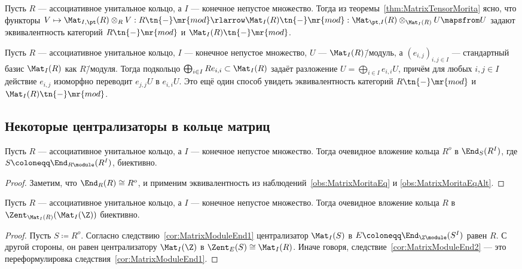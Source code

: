 \documentclass[
	extrafontsizes,
	11pt,
	hyphens,
]{memoir}
\begin{document}
\begin{observation}
Пусть \(R\) --- ассоциативное унитальное кольцо, а \(I\) --- конечное непустое множество.%
\label{obs:MatrixMoritaEq}
Тогда из теоремы~\ref{thm:MatrixTensorMorita} ясно, что функторы \(V \mapsto \Mat_{I, \pt}(R) \otimes_R V : R\tn{-}\mr{mod} \rlarrow \Mat_I(R)\tn{-}\mr{mod} : \Mat_{\pt, I}(R) \otimes_{\Mat_I(R)} U \mapsfrom U\)
задают эквивалентность категорий \(R\tn{-}\mr{mod}\) и \(\Mat_I(R)\tn{-}\mr{mod}\).
\end{observation}

\begin{observation}
Пусть \(R\) --- ассоциативное унитальное кольцо, \(I\) --- конечное непустое множество, \(U\) --- \(\Mat_I(R)\)\=/модуль, а \((e_{i,j})_{i,j \in I}\) --- стандартный базис \(\Mat_I(R)\) как \(R\)\=/модуля.%
\label{obs:MatrixMoritaEqAlt}
Тогда подкольцо \(\bigoplus_{i \in I} R e_{i,i} \subset \Mat_I(R)\) задаёт разложение \(U = \bigoplus_{i \in I} e_{i,i} U\), причём для любых \(i,j \in I\) действие \(e_{i,j}\) изоморфно переводит \(e_{j,j} U\) в \(e_{i,i} U\). Это ещё один способ увидеть эквивалентность категорий \(R\tn{-}\mr{mod}\) и \(\Mat_I(R)\tn{-}\mr{mod}\).
\end{observation}

\subsection{Некоторые централизаторы в кольце матриц}

\begin{corollary}
Пусть \(R\) --- ассоциативное унитальное кольцо, а \(I\) --- конечное непустое множество.%
\label{cor:MatrixModuleEnd1}
Тогда очевидное вложение кольца \(R^o\) в \(\End_S(R^I)\), где \(S \coloneqq \End_{R\module}(R^I)\), биективно.
\end{corollary}

\begin{proof}
Заметим, что \(\End_R(R) \cong R^o\), и применим эквивалентность из наблюдений~\ref{obs:MatrixMoritaEq} и \ref{obs:MatrixMoritaEqAlt}.
\end{proof}

\begin{corollary}
Пусть \(R\) --- ассоциативное унитальное кольцо, а \(I\) --- конечное непустое множество.%
\label{cor:MatrixModuleEnd2}
Тогда очевидное вложение кольца \(R\) в \(\Zent_{\Mat_I(R)}(\Mat_I(\Z))\) биективно.
\end{corollary}

\begin{proof}
Пусть \(S \coloneqq R^o\).
Согласно следствию~\ref{cor:MatrixModuleEnd1} централизатор \(\Mat_I(S)\) в \(E \coloneqq \End_{\Z\module}(S^I)\) равен \(R\).
С другой стороны, он равен централизатору \(\Mat_I(\Z)\) в \(\Zent_E(S) \cong \Mat_I(R)\).
Иначе говоря, следствие~\ref{cor:MatrixModuleEnd2} --- это переформулировка следствия~\ref{cor:MatrixModuleEnd1}.
\end{proof}
\end{document}
